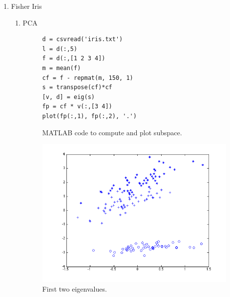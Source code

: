 \documentclass[12pt]{article}
\begin{document}
\begin{enumerate}
\begin{enumerate}
Note that each term $(\alpha_k x_k-\alpha_k y_k)^2$ is symmetric because swapping the variables $x_k$ and $y_k$ changes the sign of the subtraction but not the value after it is squared. It follows that the sum of these values and the square root of said sum are also symmetric.
\item Triangle Inequality: $ D(x,y) + D(y,z) \geq D(x,z) $ \\
Let $g_{xy} = \alpha_k x_k-\alpha_k y_k$ in $\sqrt{\sum_{k=1}^dg_{xy}^2} + \sqrt{\sum_{k=1}^dg_{yz}^2} \geq \sqrt{\sum_{k=1}^dg_{xz}^2}$. From the problem statement we know that $g$ is a real valued vector and. From the non-negativity property it follows that $\sum_{k=1}^dg_{xy}^2 + \sum_{k=1}^dg_{yz}^2 \geq \sum_{k=1}^dg_{xz}^2$. Note that this is Cauchy–Schwarz inequality for vectors in an inner product space.\\
\qed
\end{enumerate}
\newpage
\item Fisher Iris
\begin{enumerate}
\item PCA
\begin{figure}[H]
\begin{verbatim}
d = csvread('iris.txt')
l = d(:,5)
f = d(:,[1 2 3 4])
m = mean(f)
cf = f - repmat(m, 150, 1)
s = transpose(cf)*cf
[v, d] = eig(s)
fp = cf * v(:,[3 4])
plot(fp(:,1), fp(:,2), '.')
\end{verbatim}
\caption{MATLAB code to compute and plot subspace.}
\end{figure}
\begin{figure}[H]
\centering
\includegraphics[width=5in]{2a}
\caption{First two eigenvalues.}
\end{figure}

\end{enumerate}
\end{enumerate}
\end{document}
